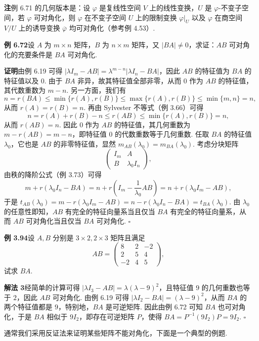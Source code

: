 \documentclass[UTF8,12pt,a4paper,fontset=fandol]{ctexart}
\begin{document}
\noindent\textbf{注}\quad 例 6.71 的几何版本是：设 $\varphi$ 是复线性空间 $V$ 上的线性变换，$U$ 是 $\varphi$-不变子空间，若 $\varphi$ 可对角化，则 $\varphi$ 在不变子空间 $U$ 上的限制变换 $\varphi|_U$ 以及 $\varphi$ 在商空间 $V/U$ 上的诱导变换 $\overline{\varphi}$ 均可对角化（参考例 4.53）.

\noindent\textbf{例 6.72}\quad 设 $A$ 为 $m\times n$ 矩阵，$B$ 为 $n\times m$ 矩阵，又 $|BA|\ne 0$，求证：$AB$ 可对角化的充要条件是 $BA$ 可对角化.

\noindent\textbf{证明}\quad 由例 6.19 可得 $|\lambda I_m-AB|=\lambda^{m-n}|\lambda I_n-BA|$，因此 $AB$ 的特征值为 $BA$ 的特征值以及 $0$. 由于 $BA$ 非异，故其特征值全部非零，从而 $0$ 作为 $AB$ 的特征值，其代数重数为 $m-n$. 另一方面，我们有
\[
n=r(BA)\le \min\{r(A),r(B)\}\le \max\{r(A),r(B)\}\le \min\{m,n\}=n,
\]
从而 $r(A)=r(B)=n$. 再由 Sylvester 不等式（例 3.66）可得
\[
n=r(A)+r(B)-n\le r(AB)\le \min\{r(A),r(B)\}=n,
\]
从而 $r(AB)=n$. 因此 $0$ 作为 $AB$ 的特征值，其几何重数为 $m-r(AB)=m-n$，即特征值 $0$ 的代数重数等于几何重数. 任取 $BA$ 的特征值 $\lambda_0$，它也是 $AB$ 的非零特征值，显然 $m_{AB}(\lambda_0)=m_{BA}(\lambda_0)$. 考虑分块矩阵
\[
\left(\begin{array}{cc}
I_m & A\\
B & \lambda_0I_n
\end{array}\right),
\]
由秩的降阶公式（例 3.73）可得
\[
m+r(\lambda_0I_n-BA)=n+r\left(I_m-\frac{1}{\lambda_0}AB\right)=n+r(\lambda_0I_m-AB),
\]
于是 $t_{AB}(\lambda_0)=m-r(\lambda_0I_m-AB)=n-r(\lambda_0I_n-BA)=t_{BA}(\lambda_0)$. 由 $\lambda_0$ 的任意性即知，$AB$ 有完全的特征向量系当且仅当 $BA$ 有完全的特征向量系，从而 $AB$ 可对角化当且仅当 $BA$ 可对角化. $\square$

\noindent\textbf{例 3.94}\quad 设 $A,B$ 分别是 $3\times 2,2\times 3$ 矩阵且满足
\[
AB=\left(\begin{array}{ccc}
8 & 2 & -2\\
2 & 5 & 4\\
-2 & 4 & 5
\end{array}\right),
\]
试求 $BA$.

\noindent\textbf{解法 3}\quad 经简单的计算可得 $|\lambda I_3-AB|=\lambda(\lambda-9)^2$，且特征值 $9$ 的几何重数也等于 $2$，因此 $AB$ 可对角化. 由例 6.19 可得 $|\lambda I_2-BA|=(\lambda-9)^2$，从而 $BA$ 的两个特征值都是 $9$，特别地，$BA$ 是可逆矩阵. 因此由例 6.72 可知 $BA$ 也可对角化，于是 $BA$ 相似于 $9I_2$，即存在可逆矩阵 $P$，使得 $BA=P^{-1}(9I_2)P=9I_2$. $\square$

通常我们采用反证法来证明某些矩阵不能对角化，下面是一个典型的例题.
\end{document}

